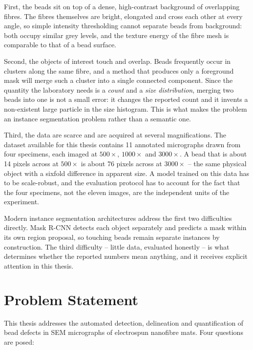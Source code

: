 First, the beads sit on top of a dense, high-contrast background of overlapping
fibres. The fibres themselves are bright, elongated and cross each other at every
angle, so simple intensity thresholding cannot separate beads from background:
both occupy similar grey levels, and the texture energy of the fibre mesh is
comparable to that of a bead surface.

Second, the objects of interest touch and overlap. Beads frequently occur in
clusters along the same fibre, and a method that produces only a foreground mask
will merge such a cluster into a single connected component. Since the quantity the
laboratory needs is a \emph{count} and a \emph{size distribution}, merging two beads
into one is not a small error: it changes the reported count and it invents a
non-existent large particle in the size histogram. This is what makes the problem an
instance segmentation problem rather than a semantic one.

Third, the data are scarce and are acquired at several magnifications. The dataset
available for this thesis contains 11 annotated micrographs drawn from four
specimens, each imaged at $500\times$, $1000\times$ and $3000\times$. A bead that is
about 14 pixels across at $500\times$ is about 76 pixels across at $3000\times$ --
the same physical object with a sixfold difference in apparent size. A model trained
on this data has to be scale-robust, and the evaluation protocol has to account for
the fact that the four specimens, not the eleven images, are the independent units
of the experiment.

Modern instance segmentation architectures address the first two difficulties
directly. Mask R-CNN \cite{he2017mask} detects each object separately and predicts
a mask within its own region proposal, so touching beads remain separate instances
by construction. The third difficulty -- little data, evaluated honestly -- is what
determines whether the reported numbers mean anything, and it receives explicit
attention in this thesis.

\section{Problem Statement}

This thesis addresses the automated detection, delineation and quantification of
bead defects in SEM micrographs of electrospun nanofibre mats. Four questions are
posed:

